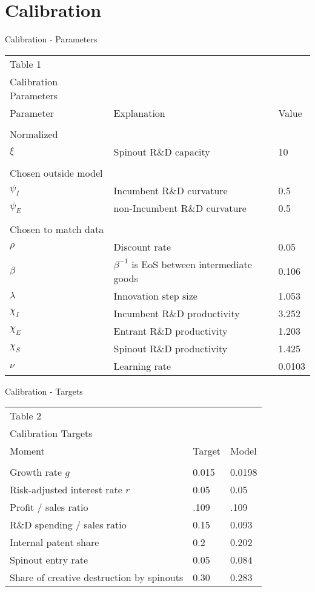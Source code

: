 \documentclass[english,usenames,dvipsnames]{beamer}
\begin{document}
\section{Calibration}

\begin{frame}{Calibration - Parameters}
	\begin{table}[h]
		\footnotesize
		\centering{}%
		\begin{tabular}{lll}
			Table 1 &  &  \tabularnewline
			Calibration Parameters &  &  \tabularnewline
			\hline 
			Parameter & Explanation & Value\tabularnewline
			\tabularnewline
			\hline 
			Normalized & & \tabularnewline
			$\xi$ & Spinout R\&D capacity & 10 \tabularnewline
			&  & \tabularnewline
			Chosen outside model & & \tabularnewline
			$\psi_I$ & Incumbent R\&D curvature & 0.5\tabularnewline
			$\psi_E$ & non-Incumbent R\&D curvature & 0.5\tabularnewline
			&  & \tabularnewline
			Chosen to match data & & \tabularnewline
			$\rho$ & Discount rate & 0.05\tabularnewline
			$\beta$ & $\beta^{-1}$ is EoS between intermediate goods & 0.106\tabularnewline
			$\lambda$ & Innovation step size & 1.053\tabularnewline
			$\chi_I$ & Incumbent R\&D productivity & 3.252\tabularnewline
			$\chi_E$ & Entrant R\&D productivity & 1.203\tabularnewline
			$\chi_S$ & Spinout R\&D productivity & 1.425\tabularnewline
			$\nu$ & Learning rate & 0.0103
		\end{tabular}
	\end{table}
\end{frame}

\begin{frame}{Calibration - Targets}
	\begin{table}[H]
		\footnotesize
		\centering{}%
		\begin{tabular}{lll}
			Table 2 &  &  \tabularnewline
			Calibration Targets &  &  \tabularnewline
			\hline 
			Moment  & Target & Model \tabularnewline
			&   & \tabularnewline
			\hline 
			Growth rate $g$ & 0.015 & 0.0198 \tabularnewline
			Risk-adjusted interest rate $r$ & 0.05 & 0.05 \tabularnewline
			Profit / sales ratio & .109 & .109 \tabularnewline
			R\&D spending / sales ratio & 0.15 & 0.093
			\tabularnewline
			Internal patent share & 0.2 & 0.202
			\tabularnewline
			Spinout entry rate & 0.05 & 0.084
			\tabularnewline
			Share of creative destruction by spinouts & 0.30 & 0.283 
		\end{tabular}
	\end{table}
\end{frame}
\end{document}
